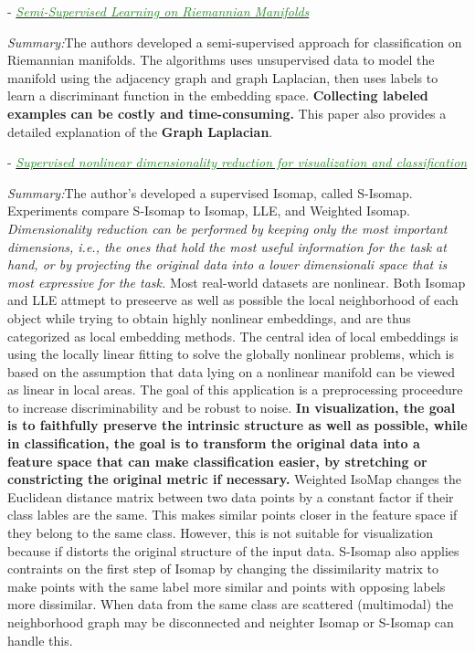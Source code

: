 \documentclass[]{article}
\newcommand{\paperentry}[4]{
            \hangindent=1cm
            \textcolor{red}{\cite{#1}} - \href{run:../References/#3}{\textcolor{ForestGreen}{\textit{#2}}}
            
            \noindent            
            \begin{minipage}[t]{0.1\linewidth}\hfill\end{minipage}
            \begin{minipage}[t]{0.8\linewidth}\textcolor{NavyBlue}{{\textit{Summary:}}}#4\end{minipage}
            \vspace{.25cm}
          }
\begin{document}
	
	\paperentry{Belkin2004SemiSupLearningRiemannianManifolds}
	{Semi-Supervised Learning on Riemannian Manifolds}
	{Manifold_Representation_Learning/Supervised/Belkin2004SemiSupLearningRiemannianManifolds.pdf}
	{The authors developed a semi-supervised approach for classification on Riemannian manifolds.  The algorithms uses unsupervised data to model the manifold using the adjacency graph and graph Laplacian, then uses labels to learn a discriminant function in the embedding space. \textbf{Collecting labeled examples can be costly and time-consuming.}  This paper also provides a detailed explanation of the \textbf{Graph Laplacian}.}
	
	\paperentry{Geng2005SupNonlinearDimRed}
	{Supervised nonlinear dimensionality reduction for visualization and classification}
	{Manifold_Representation_Learning/Supervised/Geng2005SupNonlinearDimRed.pdf}
	{The author's developed a supervised Isomap, called S-Isomap.  Experiments compare S-Isomap to Isomap, LLE, and Weighted Isomap. \textit{Dimensionality reduction can be performed by keeping only the most important dimensions, i.e., the ones that hold the most useful information for the task at hand, or by projecting the original data into a lower dimensionali space that is most expressive for the task.}  Most real-world datasets are nonlinear.  Both Isomap and LLE attmept to preseerve as well as possible the local neighborhood of each object while trying to obtain highly nonlinear embeddings, and are thus categorized as local embedding methods.  The central idea of local embeddings is using the locally linear fitting to solve the globally nonlinear problems, which is based on the assumption that data lying on a nonlinear manifold can be viewed as linear in local areas.  The goal of this application is a preprocessing proceedure to increase discriminability and be robust to noise.  \textbf{In visualization, the goal is to faithfully preserve the intrinsic structure as well as possible, while in classification, the goal is to transform the original data into a feature space that can make classification easier, by stretching or constricting the original metric if necessary.}  Weighted IsoMap changes the Euclidean distance matrix between two data points by a constant factor if their class lables are the same.  This makes similar points closer in the feature space if they belong to the same class.  However, this is not suitable for visualization because if distorts the original structure of the input data. S-Isomap also applies contraints on the first step of Isomap by changing the dissimilarity matrix to make points with the same label more similar and points with opposing labels more dissimilar.  When data from the same class are scattered (multimodal) the neighborhood graph may be disconnected and neighter Isomap or S-Isomap can handle this. }
	
\end{document}
